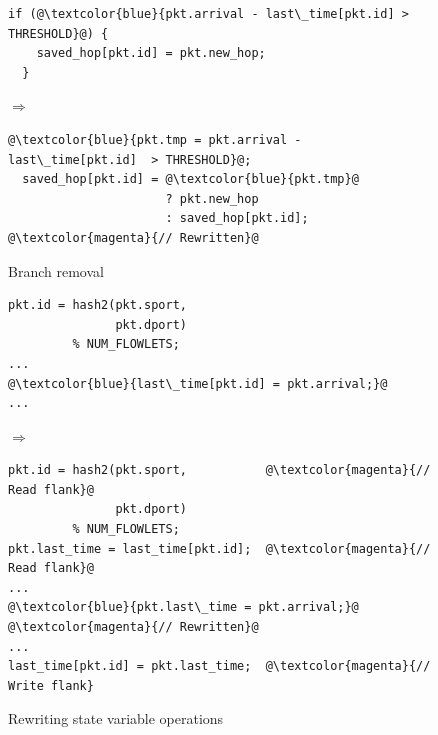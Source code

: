 \begin{figure}[!t]
  \hspace{-0.3in}
  \begin{minipage}{0.55\textwidth}
  \begin{small}
  \begin{lstlisting}[style=customc, numbers=none, frame=none]
  if (@\textcolor{blue}{pkt.arrival - last\_time[pkt.id] > THRESHOLD}@) {
    saved_hop[pkt.id] = pkt.new_hop;
  }
  \end{lstlisting}
  \end{small}
  \end{minipage}
%  
  \hspace{-0.5in}
  $\Longrightarrow$ 
  \hspace{-0.3in}
%  
  \begin{minipage}{0.6\textwidth}
  \begin{small}
  \begin{lstlisting}[style=customc, numbers=none, frame=none]
  @\textcolor{blue}{pkt.tmp = pkt.arrival - last\_time[pkt.id]  > THRESHOLD}@;
  saved_hop[pkt.id] = @\textcolor{blue}{pkt.tmp}@
                      ? pkt.new_hop
                      : saved_hop[pkt.id]; @\textcolor{magenta}{// Rewritten}@
  \end{lstlisting}
  \end{small}
  \end{minipage}
\caption{Branch removal}
\label{fig:if_convert}
\end{figure}

\begin{figure}[!t]
  \begin{minipage}{0.43\textwidth}
  \begin{small}
  \begin{lstlisting}[style=customc, numbers=none, frame=none]
pkt.id = hash2(pkt.sport,
               pkt.dport)
         % NUM_FLOWLETS;
...
@\textcolor{blue}{last\_time[pkt.id] = pkt.arrival;}@
...
  \end{lstlisting}
  \end{small}
  \end{minipage}
%  
  \hspace{-0.5in}
  $\Longrightarrow$ 
  \hspace{-0.2in}
%  
  \begin{minipage}{0.61\textwidth}
  \begin{small}
  \begin{lstlisting}[style=customc, numbers=none, frame=none]
pkt.id = hash2(pkt.sport,           @\textcolor{magenta}{// Read flank}@
               pkt.dport)
         % NUM_FLOWLETS;
pkt.last_time = last_time[pkt.id];  @\textcolor{magenta}{// Read flank}@
...
@\textcolor{blue}{pkt.last\_time = pkt.arrival;}@             @\textcolor{magenta}{// Rewritten}@
...
last_time[pkt.id] = pkt.last_time;  @\textcolor{magenta}{// Write flank}
  \end{lstlisting}
  \end{small}
  \end{minipage}
  \caption{Rewriting state variable operations}
\label{fig:stateful_flanks}
\end{figure}

